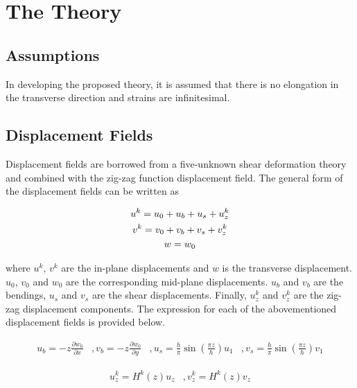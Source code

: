 \documentclass{article}
\begin{document}
\section{The Theory}
\subsection{Assumptions}
In developing the proposed theory, it is assumed that there is no elongation in the transverse direction and strains are infinitesimal.

\subsection{Displacement Fields}
Displacement fields are borrowed from a five-unknown shear deformation theory and combined with the zig-zag function displacement field. The general form of the displacement fields can be written as

\begin{gather}
    u^k = u_0 + u_b + u_s + u_z^k \notag\\
    v^k = v_0 + v_b + v_s + v_z^k \notag\\
    w = w_0
\end{gather}

where $u^k$, $v^k$ are the in-plane displacements and $w$ is the transverse displacement. $u_0$, $v_0$ and $w_0$ are the corresponding mid-plane displacements. $u_b$ and $v_b$ are the bendings, $u_s$ and $v_s$ are the shear displacements. Finally, $u_z^k$ and $v_z^k$ are the zig-zag displacement components. The expression for each of the abovementioned displacement fields is provided below. 

\begin{equation*}
    \begin{matrix}
    u_b = -z \displaystyle\frac{\partial w_0}{\partial x} & , 
    v_b = -z \displaystyle\frac{\partial w_0}{\partial y} & , 
    u_s = \displaystyle\frac{h}{\pi} \sin \left (\displaystyle\frac{\pi z}{h} \right ) u_1 & ,
    v_s = \displaystyle\frac{h}{\pi} \sin \left (\displaystyle\frac{\pi z}{h} \right ) v_1
    \end{matrix}
\end{equation*}

\begin{equation*}
    \begin{matrix}
    u_z^k = H^k(z) u_z &, 
    v_z^k = H^k(z) v_z
    \end{matrix}
\end{equation*}
\end{document}
